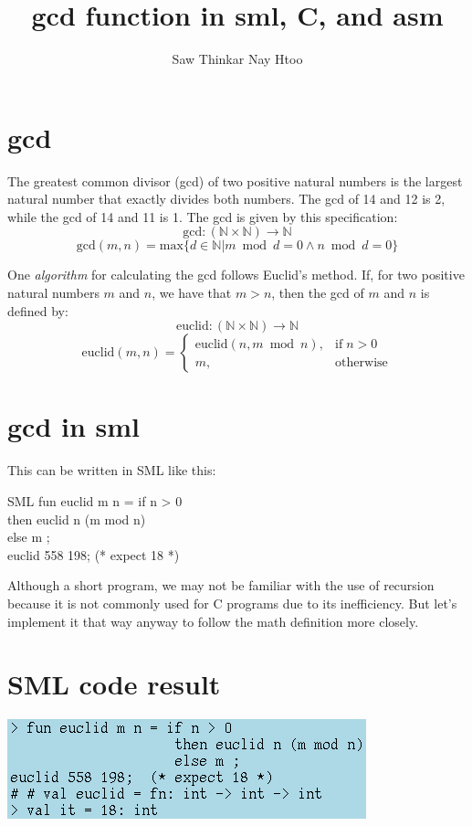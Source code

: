 \documentclass{article}
\title{gcd function in sml, C, and asm}
\begin{document}
 
\author{Saw Thinkar Nay Htoo}
\maketitle

\clearpage

\hypertarget{p2}{\section{gcd}}

The greatest common divisor (gcd) of two positive natural numbers is the largest natural 
number that exactly divides both numbers. 
The gcd of 14 and 12 is 2, while the gcd of 14 and 11 is 1.
The gcd is given by this specification:
\[ \text{gcd} : (\mathbb{N} \times \mathbb{N}) \rightarrow \mathbb{N} \]
\[ \text{gcd}(m,n) = \text{max}\{d \in \mathbb{N} \vert m \bmod d = 0 \land n \bmod d = 0\} \]

One {\it algorithm} for calculating the gcd follows Euclid's method. If, for two positive natural
numbers $m$ and $n$, we have that $m>n$, then the gcd of $m$ and $n$ is defined by:
\[ \text{euclid} : (\mathbb{N} \times \mathbb{N}) \rightarrow \mathbb{N} \]
\[ \text{euclid}(m,n) = 
     \left\{
        \begin{array}{lr}
             \text{euclid}(n,m \bmod n), & \text{if} \; n > 0 \\
             m, & \text{otherwise}
        \end{array}
      \right.
 \]
\clearpage

\hypertarget{p3}{\section{gcd in sml}}
This can be written in SML like this:
\begin{GFT}{SML}
\+fun euclid m n = if n > 0\\
\+                    then euclid n (m mod n)\\
\+                    else m ;\\
\+euclid 558 198;  (* expect 18 *)\\
\end{GFT}

Although a short program, we may not be familiar with the use of recursion because it is not commonly used for C programs due to its inefficiency. But let's implement it that way anyway to follow the math definition more closely.\\
\section{SML code result}
\includegraphics[scale=0.6]{euclidsml.png}
\clearpage
\end{document}
